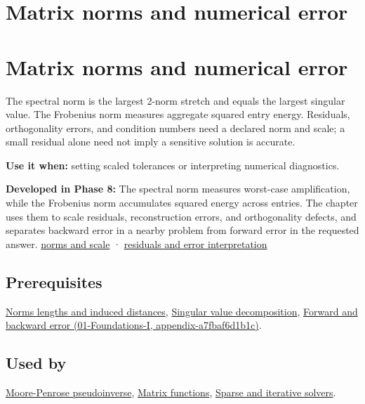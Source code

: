 \hypertarget{appendix-f8657bac66e5}{}
\section*{Matrix norms and numerical error}
\section{Matrix norms and numerical error}\label{matrix-norms-and-numerical-error}

The spectral norm is the largest 2-norm stretch and equals the largest singular value. The Frobenius norm measures aggregate squared entry energy. Residuals, orthogonality errors, and condition numbers need a declared norm and scale; a small residual alone need not imply a sensitive solution is accurate.

\textbf{Use it when:} setting scaled tolerances or interpreting numerical diagnostics.

\textbf{Developed in Phase 8:} The spectral norm measures worst-case amplification, while the Frobenius norm accumulates squared energy across entries. The chapter uses them to scale residuals, reconstruction errors, and orthogonality defects, and separates backward error in a nearby problem from forward error in the requested answer. \href{Continuous\%20Notes/Computing\%20Foundations\%20-\%20From\%20Bits\%20to\%20C++\%20and\%20Systems\%20APIs\#Matrix\%20norms\%20put\%20scale\%20into\%20error\%20statements}{norms and scale} · \href{Continuous\%20Notes/Computing\%20Foundations\%20-\%20From\%20Bits\%20to\%20C++\%20and\%20Systems\%20APIs\#Residuals\%20distinguish\%20backward\%20accuracy\%20from\%20forward\%20certainty}{residuals and error interpretation}

\subsection{Prerequisites}\label{prerequisites}

\hyperref[appendix-49933872bb51]{Norms lengths and induced distances}, \hyperref[appendix-1fad5e7f36fa]{Singular value decomposition}, \href{}{Forward and backward error (01-Foundations-I, appendix-a7fbaf6d1b1c)}.

\subsection{Used by}\label{used-by}

\hyperref[appendix-541306fdbc1b]{Moore-Penrose pseudoinverse}, \hyperref[appendix-0f4bc2bf2b1f]{Matrix functions}, \hyperref[appendix-67c87a3d9e94]{Sparse and iterative solvers}.

